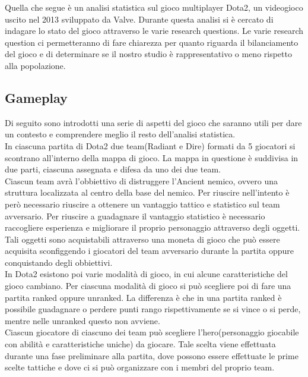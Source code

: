 Quella che segue è un analisi statistica sul gioco multiplayer Dota2, un videogioco uscito nel 2013 sviluppato da Valve. Durante questa analisi si è cercato di indagare lo stato del gioco attraverso le varie research questions. Le varie research question ci permetteranno di fare chiarezza per quanto riguarda il bilanciamento del gioco e di determinare se il nostro studio è rappresentativo o meno rispetto alla popolazione.
\subsection{Gameplay}
Di seguito sono introdotti una serie di aspetti del gioco che saranno utili per dare un contesto e comprendere meglio il resto dell'analisi statistica. \\ 
In ciascuna partita di Dota2 due team(Radiant e Dire) formati da 5 giocatori si scontrano all'interno della mappa di gioco. La mappa in questione è suddivisa in due parti, ciascuna assegnata e difesa da uno dei due team. \\
Ciascun team avrà l'obbiettivo di distruggere l'Ancient nemico, ovvero una struttura localizzata al centro della base del nemico. Per riuscire nell'intento è però necessario riuscire a ottenere un vantaggio tattico e statistico sul team avversario. 
Per riuscire a guadagnare il vantaggio statistico è necessario raccogliere esperienza e migliorare il proprio personaggio attraverso degli oggetti. Tali oggetti sono acquistabili attraverso una moneta di gioco che può essere acquisita sconfiggendo i giocatori del team avversario durante la partita oppure conquistando degli obbiettivi. \\
In Dota2 esistono poi varie modalità di gioco, in cui alcune caratteristiche del gioco cambiano. Per ciascuna modalità di gioco si può scegliere poi di fare una partita ranked oppure unranked. La differenza è che in una partita ranked è possibile guadagnare o perdere punti rango rispettivamente se si vince o si perde, mentre nelle unranked questo non avviene. \\
Ciascun giocatore di ciascuno dei team può scegliere l'hero(personaggio giocabile con abilità e caratteristiche uniche) da giocare. Tale scelta viene effettuata durante una fase preliminare alla partita, dove possono essere effettuate le prime scelte tattiche e dove ci si può organizzare con i membri del proprio team.

